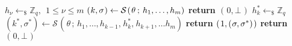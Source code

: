 \documentclass[psamsfonts, reqno]{amsart}
\theoremstyle{definition}
\theoremstyle{remark}
\numberwithin{equation}{section}
\begin{document}
\begin{minipage}{0.64\textwidth}
\begin{algorithm}[H]
  \caption{$\textsf{LocalFork}_{\mathcal{S}}(\hspace{0.5pt}\theta\hspace{0.5pt})$}
  \begin{algorithmic}[1]
  	\vspace{4pt}
			\State
				$h_\nu \leftarrow_\$ \mathbb{Z}_q,
				\ \ 1 \le \nu\le m$
				\vspace{6pt}
			\State
				$(
					\hspace{0.5pt}
					k,
					\sigma\hspace{0.5pt}
				)
				\leftarrow
				\mathcal{S}
				\hspace{1pt}
				(
					\hspace{1pt}\theta\hspace{2pt};
					\hspace{2pt} h_1,
					\dots,
					h_m
				)$
				\vspace{6pt}
			\vspace{2pt}
    			\State
    				\textbf{return
    					$(
    						\hspace{1pt}
    						0,
    						\bot
    						\hspace{1pt}
    					)
    					$
    				}\vspace{2pt}
			\EndIf
			\State
				$h_k^* \leftarrow_\$ \mathbb{Z}_q$
				\vspace{7pt}
			\State
				$(k^*, \sigma^*) \leftarrow
				\mathcal{S}
					\hspace{1pt}
					(
						\hspace{1pt}
						\theta
						\hspace{2pt}
					;
					\hspace{2pt}h_1,
					\dots,
					h_{k-1},
					\hspace{1pt}h_k^*,
					\hspace{1pt} h_{k+1},
					\dots
					h_m
				)$
				\vspace{6pt}
			\vspace{4pt}
				\State
					\textbf{return
						$(
							\hspace{1pt}
							1,
							(
								\hspace{0.5pt}
								\sigma,
								\sigma^*
							)
							\hspace{1pt})
						$}
					\vspace{3pt}
			\EndIf
			\State
				\textbf{return
					$(
						\hspace{1pt}
						0,
						\bot
						\hspace{1pt}
					)$
				}
  \end{algorithmic}
\end{algorithm}
\vspace{5pt}
\end{minipage}
\end{document}
